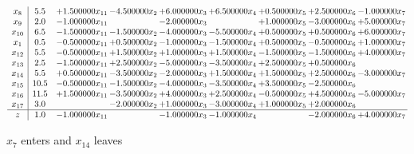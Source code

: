\documentclass[10pt]{article}
\begin{document}
 \[\begin{array}{c| c c@{\hskip 2pt} c@{\hskip 2pt} c@{\hskip 2pt} c@{\hskip 2pt} c@{\hskip 2pt} c@{\hskip 2pt} c@{\hskip 2pt} }
 x_{8}   &  5.5 & + 1.500000 x_{11} & -4.500000 x_{2} & + 6.000000 x_{3} & + 6.500000 x_{4} & + 0.500000 x_{5} & + 2.500000 x_{6} & -1.000000 x_{7}\\
 x_{9}   &  2.0 & -1.000000 x_{11} &   & -2.000000 x_{3} &   & + 1.000000 x_{5} & -3.000000 x_{6} & + 5.000000 x_{7}\\
 x_{10}   &  6.5 & -1.500000 x_{11} & -1.500000 x_{2} & -4.000000 x_{3} & -5.500000 x_{4} & + 0.500000 x_{5} & + 0.500000 x_{6} & + 6.000000 x_{7}\\
 x_{1}   &  0.5 & -0.500000 x_{11} & + 0.500000 x_{2} & -1.000000 x_{3} & -1.500000 x_{4} & + 0.500000 x_{5} & -0.500000 x_{6} & + 1.000000 x_{7}\\
 x_{12}   &  5.5 & -0.500000 x_{11} & + 1.500000 x_{2} & + 1.000000 x_{3} & + 1.500000 x_{4} & -1.500000 x_{5} & -1.500000 x_{6} & + 4.000000 x_{7}\\
 x_{13}   &  2.5 & -1.500000 x_{11} & + 2.500000 x_{2} & -5.000000 x_{3} & -3.500000 x_{4} & + 2.500000 x_{5} & + 0.500000 x_{6} &   \\
 x_{14}   &  5.5 & + 0.500000 x_{11} & -3.500000 x_{2} & -2.000000 x_{3} & + 1.500000 x_{4} & + 1.500000 x_{5} & + 2.500000 x_{6} & -3.000000 x_{7}\\
 x_{15}   &  10.5 & -0.500000 x_{11} & -1.500000 x_{2} & -4.000000 x_{3} & -3.500000 x_{4} & + 3.500000 x_{5} & -2.500000 x_{6} &   \\
 x_{16}   &  11.5 & + 1.500000 x_{11} & -3.500000 x_{2} & + 4.000000 x_{3} & + 2.500000 x_{4} & -0.500000 x_{5} & + 4.500000 x_{6} & -5.000000 x_{7}\\
 x_{17}   &  3.0  &   & -2.000000 x_{2} & + 1.000000 x_{3} & -3.000000 x_{4} & + 1.000000 x_{5} & + 2.000000 x_{6} &   \\
\hline
z    &  1.0 & -1.000000 x_{11} &   & -1.000000 x_{3} & -1.000000 x_{4} &   & -2.000000 x_{6} & + 4.000000 x_{7}\\
\end{array}\]


 $ x_{7} $ enters and $ x_{14} $ leaves 
\end{document}
